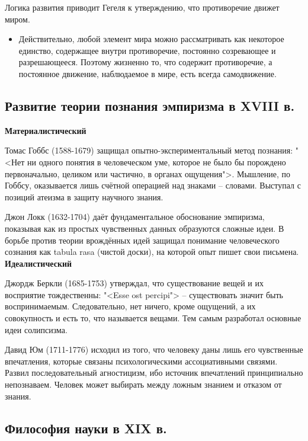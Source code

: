 \documentclass[main.tex]{subfiles}
\begin{document}
{\parindent0pt
Логика развития приводит Гегеля к утверждению, что противоречие движет миром.
\begin{itemize}[nosep,leftmargin=0.5cm]
\item Действительно, любой элемент мира можно рассматривать как некоторое единство, содержащее внутри противоречие, постоянно созревающее и разрешающееся.
Поэтому жизненно то, что содержит противоречие, а постоянное движение, наблюдаемое в мире, есть всегда самодвижение.
\end{itemize}
}



\subsection{Развитие теории познания эмпиризма в XVIII в.}

{\parindent0pt

\textbf{Материалистический}

Томас Гоббс (1588-1679) защищал опытно-экспериментальный метод познания: "<Нет ни одного понятия в человеческом уме, которое не было бы порождено первоначально, целиком или частично, в органах ощущения">.
Мышление, по Гоббсу, оказывается лишь счётной операцией над знаками -- словами.
Выступал с позиций атеизма в защиту научного знания.


Джон Локк (1632-1704) даёт фундаментальное обоснование эмпиризма, показывая как из простых чувственных данных образуются сложные идеи.
В борьбе против теории врождённых идей защищал понимание человеческого сознания как tabula rasa (чистой доски), на которой опыт пишет свои письмена.
\\

\textbf{Идеалистический}

Джордж Беркли (1685-1753) утверждал, что существование вещей и их восприятие тождественны: "<Esse ost percipi"> -- существовать значит быть воспринимаемым.
Следовательно, нет ничего, кроме ощущений, а их совокупность и есть то, что называется вещами.
Тем самым разработал основные идеи солипсизма.

Давид Юм (1711-1776) исходил из того, что человеку даны лишь его чувственные впечатления, которые связаны психологическими ассоциативными связями.
Развил последовательный агностицизм, ибо источник впечатлений принципиально непознаваем.
Человек может выбирать между ложным знанием и отказом от знания.
}



\subsection{Философия науки в XIX в.}
\end{document}
